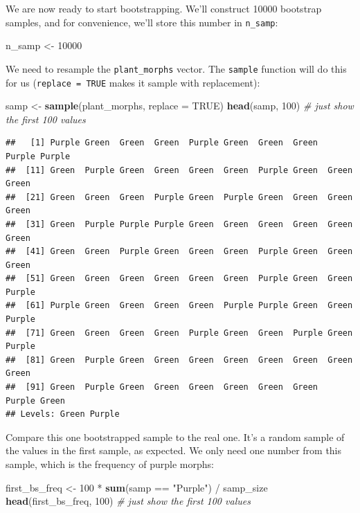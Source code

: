 \documentclass[]{book}
\newenvironment{Shaded}{\begin{snugshade}}{\end{snugshade}}
\newcommand{\KeywordTok}[1]{\textcolor[rgb]{0.13,0.29,0.53}{\textbf{{#1}}}}
\newcommand{\DataTypeTok}[1]{\textcolor[rgb]{0.13,0.29,0.53}{{#1}}}
\newcommand{\DecValTok}[1]{\textcolor[rgb]{0.00,0.00,0.81}{{#1}}}
\newcommand{\StringTok}[1]{\textcolor[rgb]{0.31,0.60,0.02}{{#1}}}
\newcommand{\CommentTok}[1]{\textcolor[rgb]{0.56,0.35,0.01}{\textit{{#1}}}}
\newcommand{\OtherTok}[1]{\textcolor[rgb]{0.56,0.35,0.01}{{#1}}}
\newcommand{\NormalTok}[1]{{#1}}
\begin{document}
We are now ready to start bootstrapping. We'll construct 10000 bootstrap
samples, and for convenience, we'll store this number in
\texttt{n\_samp}:

\begin{Shaded}
\begin{Highlighting}[]
\NormalTok{n_samp <-}\StringTok{ }\DecValTok{10000}
\end{Highlighting}
\end{Shaded}

We need to resample the \texttt{plant\_morphs} vector. The
\texttt{sample} function will do this for us (\texttt{replace\ =\ TRUE}
makes it sample with replacement):

\begin{Shaded}
\begin{Highlighting}[]
\NormalTok{samp <-}\StringTok{ }\KeywordTok{sample}\NormalTok{(plant_morphs, }\DataTypeTok{replace =} \OtherTok{TRUE}\NormalTok{)}
\KeywordTok{head}\NormalTok{(samp, }\DecValTok{100}\NormalTok{) }\CommentTok{# just show the first 100 values}
\end{Highlighting}
\end{Shaded}

\begin{verbatim}
##   [1] Purple Green  Green  Green  Purple Green  Green  Green  Purple Purple
##  [11] Green  Purple Green  Green  Green  Green  Purple Green  Green  Green 
##  [21] Green  Green  Green  Purple Green  Purple Green  Green  Green  Green 
##  [31] Green  Purple Purple Purple Green  Green  Green  Green  Green  Green 
##  [41] Green  Green  Purple Green  Green  Green  Purple Green  Green  Green 
##  [51] Green  Green  Green  Green  Green  Green  Purple Green  Green  Purple
##  [61] Purple Green  Green  Green  Green  Purple Purple Green  Green  Purple
##  [71] Green  Green  Green  Green  Purple Green  Green  Purple Green  Purple
##  [81] Green  Purple Green  Green  Green  Green  Green  Green  Green  Green 
##  [91] Green  Purple Green  Green  Green  Green  Green  Green  Purple Green 
## Levels: Green Purple
\end{verbatim}

Compare this one bootstrapped sample to the real one. It's a random
sample of the values in the first sample, as expected. We only need one
number from this sample, which is the frequency of purple morphs:

\begin{Shaded}
\begin{Highlighting}[]
\NormalTok{first_bs_freq <-}\StringTok{ }\DecValTok{100} \NormalTok{*}\StringTok{ }\KeywordTok{sum}\NormalTok{(samp ==}\StringTok{ "Purple"}\NormalTok{) /}\StringTok{ }\NormalTok{samp_size}
\KeywordTok{head}\NormalTok{(first_bs_freq, }\DecValTok{100}\NormalTok{) }\CommentTok{# just show the first 100 values}
\end{Highlighting}
\end{Shaded}
\end{document}
